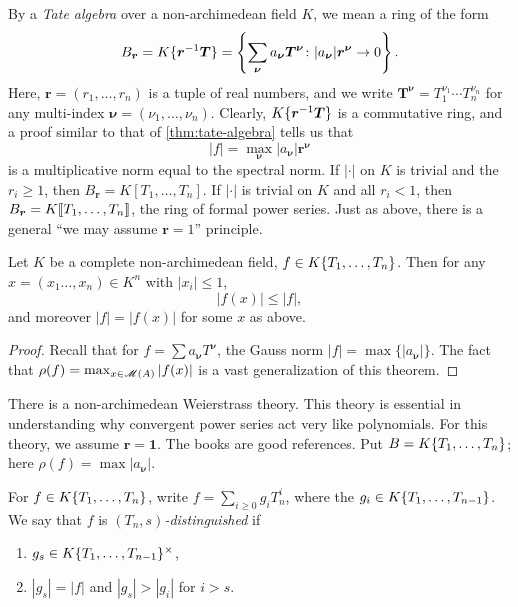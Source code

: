 By a \emph{Tate algebra} over a non-archimedean field $K$, we mean a ring of 
the form 
\[
	B_{\bm r} = K\{ \bm r^{-1} \bm T \} = \left\{\sum_{\bm \nu} a_{\bm \nu} \bm T^{\bm \nu}\colon |a_{\bm \nu}| \bm r^{\bm \nu} \to 0\right\} .
\]
Here, $\bm r=(r_1,\dots,r_n)$ is a tuple of real numbers, and we write 
$\bm T^{\bm \nu} = T_1^{\nu_1} \dotsm T_n^{\nu_n}$ for any multi-index 
$\bm \nu=(\nu_1,\dots,\nu_n)$. Clearly, $K\{ \bm r^{-1} \bm T \}$ is a 
commutative ring, and a proof similar to that of \autoref{thm:tate-algebra} 
tells us that 
\[
	|f| = \max_{\bm\nu} |a_{\bm\nu}| \bm r^{\bm\nu}
\]
is a multiplicative norm equal to the spectral norm. If $|\cdot|$ on $K$ is 
trivial and the $r_i\geqslant 1$, then $B_{\bm r} = K[T_1,\dots,T_n]$. If 
$|\cdot|$ is trivial on $K$ and all $r_i<1$, then 
$B_{\bm r} = K\llbracket T_1,\dots,T_n\rrbracket$, the ring of formal power series. Just as 
above, there is a general ``we may assume $\bm r=1$'' principle. 

\begin{theorem}
Let $K$ be a complete non-archimedean field, $f\in K\{ T_1,\dots,T_n \}$. 
Then for any $x = (x_1\dots,x_n)\in K^n$ with $|x_i|\leqslant 1$, 
\[
	|f(x)| \leqslant |f| ,
\]
and moreover $|f|=|f(x)|$ for some $x$ as above. 
\end{theorem}
\begin{proof}
Recall that for $f=\sum a_{\bm\nu} T^{\bm \nu}$, the Gauss norm 
$|f|=\max\{|a_{\bm\nu}|\}$. The fact that 
$\rho(f)=\max_{x\in \operatorname{\mathscr{M}}(A)} |f(x)|$ is a vast generalization of this 
theorem. 
\end{proof}

There is a non-archimedean Weierstrass theory. This theory is essential in 
understanding why convergent power series act very like polynomials. For this 
theory, we assume $\bm r=\bm 1$. The books \cite{bgr-1984,bosch-2014} are 
good references. Put $B=K\{ T_1,\dots,T_n \}$; here 
$\rho(f) = \max|a_{\bm \nu}|$. 

\begin{definition}
For $f\in K\{ T_1,\dots,T_n \}$, write $f=\sum_{i\geqslant 0} g_i T_n^i$, 
where the $g_i\in K\{ T_1,\dots,T_{n-1} \}$. We say that $f$ is 
\emph{$(T_n,s)$-distinguished} if 
\begin{enumerate}
\item
$g_s\in K\{ T_1,\dots,T_{n-1} \}^\times$, 

\item
$|g_s| = |f|$ and $|g_s| > |g_i|$ for $i>s$. 
\end{enumerate}
\end{definition}

